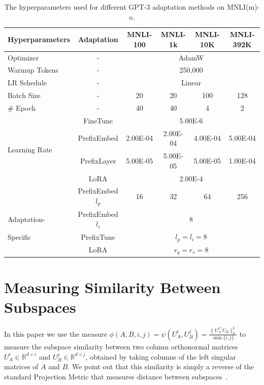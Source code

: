\begin{table}[h]
\centering
\begin{tabular}{l|c|cccc}
\hline
\toprule
Hyperparameters & Adaptation & MNLI-100 & MNLI-1k & MNLI-10K & MNLI-392K \\
\midrule
Optimizer & - & \multicolumn{4}{c}{AdamW} \\
Warmup Tokens & - & \multicolumn{4}{c}{250,000} \\
LR Schedule & - & \multicolumn{4}{c}{Linear} \\
Batch Size & - & 20 & 20 & 100 & 128 \\
\# Epoch & - & 40 & 40 & 4 & 2 \\
\midrule
\multirow{4}{*}{Learning Rate} & FineTune & \multicolumn{4}{c}{5.00E-6} \\
                               & PrefixEmbed & 2.00E-04 & 2.00E-04 & 4.00E-04 & 5.00E-04 \\
                               & PrefixLayer & 5.00E-05 & 5.00E-05 & 5.00E-05 & 1.00E-04 \\
                               & LoRA & \multicolumn{4}{c}{2.00E-4} \\
\midrule
                            & PrefixEmbed $l_p$ & 16 & 32 & 64 & 256 \\
 Adaptation-                & PrefixEmbed $l_i$ & \multicolumn{4}{c}{8} \\
 Specific                   & PrefixTune & \multicolumn{4}{c}{$l_p=l_i=8$} \\
                            & LoRA & \multicolumn{4}{c}{$r_q=r_v=8$} \\
\bottomrule
\end{tabular}
\caption{The hyperparameters used for different GPT-3 adaptation methods on MNLI(m)-$n$.}
\label{tab:hyper_gpt3_low}
\end{table}


\section{Measuring Similarity Between Subspaces}
\label{app:grassmann_distance}

In this paper we use the measure $\phi(A, B, i, j) = \psi(U_A^i, U_B^j) = \frac{\| U_A^{i\top } U_B \|_F^2}{\min \{i, j\}}$ to measure the subspace similarity between two column orthonormal matrices $U_A^i \in \mathbb{R}^{d \times i}$ and $U_B^j \in \mathbb{R}^{d \times j}$, obtained by taking columns of the left singular matrices of $A$ and $B$.
We point out that this similarity is simply a reverse of the standard Projection Metric that measures distance between subspaces~\cite{dist}.

